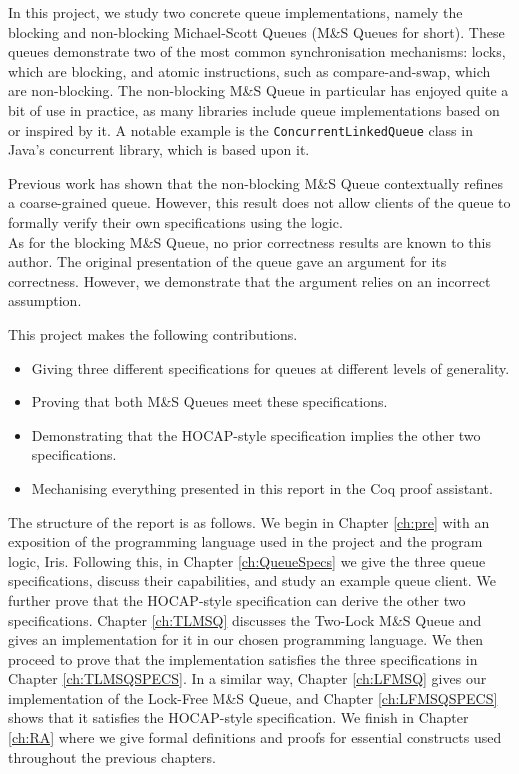 \documentclass[a4paper, 10pt]{report}
\theoremstyle{definition}
\newcommand{\msq}{M\&S Queue}
\newcommand{\tlmsq}{Two-Lock \msq{}}
\newcommand{\lfmsq}{Lock-Free \msq{}}
\begin{document}
In this project, we study two concrete queue implementations, namely the blocking and non-blocking Michael-Scott Queues (\msq{}s for short). These queues demonstrate two of the most common synchronisation mechanisms: locks, which are blocking, and atomic instructions, such as compare-and-swap, which are non-blocking. The non-blocking \msq{} in particular has enjoyed quite a bit of use in practice, as many libraries include queue implementations based on or inspired by it. A notable example is the \texttt{ConcurrentLinkedQueue} class in Java's concurrent library, which is based upon it.

Previous work \citep{DBLP:conf/cpp/VindumB21} has shown that the non-blocking \msq{} contextually refines a coarse-grained queue. However, this result does not allow clients of the queue to formally verify their own specifications using the logic.\\
As for the blocking \msq{}, no prior correctness results are known to this author. The original presentation of the queue \citep{DBLP:conf/podc/MichaelS96} gave an argument for its correctness. However, we demonstrate that the argument relies on an incorrect assumption.

This project makes the following contributions.
\begin{itemize}
  \item Giving three different specifications for queues at different levels of generality.
  \item Proving that both \msq{}s meet these specifications.
  \item Demonstrating that the HOCAP-style specification implies the other two specifications.
  \item Mechanising everything presented in this report in the Coq proof assistant.
\end{itemize}

The structure of the report is as follows. We begin in Chapter \ref{ch:pre} with an exposition of the programming language used in the project and the program logic, Iris. Following this, in Chapter \ref{ch:QueueSpecs} we give the three queue specifications, discuss their capabilities, and study an example queue client. We further prove that the HOCAP-style specification can derive the other two specifications. Chapter \ref{ch:TLMSQ} discusses the \tlmsq{} and gives an implementation for it in our chosen programming language. We then proceed to prove that the implementation satisfies the three specifications in Chapter \ref{ch:TLMSQSPECS}. In a similar way, Chapter \ref{ch:LFMSQ} gives our implementation of the \lfmsq{}, and Chapter \ref{ch:LFMSQSPECS} shows that it satisfies the HOCAP-style specification. We finish in Chapter \ref{ch:RA} where we give formal definitions and proofs for essential constructs used throughout the previous chapters.
\end{document}
